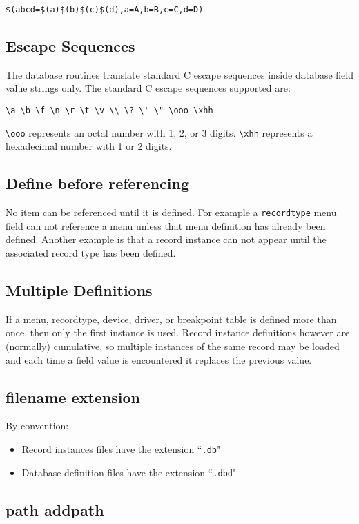 \begin{verbatim}$(abcd=$(a)$(b)$(c)$(d),a=A,b=B,c=C,d=D)
\end{verbatim}\subsection{Escape Sequences}

The database routines translate standard C escape sequences inside database field value strings only. The standard C 
escape sequences supported are:

\begin{verbatim}\a \b \f \n \r \t \v \\ \? \' \" \ooo \xhh
\end{verbatim}\verb|\ooo| represents an octal number with 1, 2, or 3 digits. \verb|\xhh| represents a hexadecimal number with 1 or 2 digits.

\subsection{Define before referencing}

No item can be referenced until it is defined. For example a \verb|recordtype| menu field can not reference a menu unless 
that menu definition has already been defined. Another example is that a record instance can not appear until the 
associated record type has been defined.

\subsection{Multiple Definitions}

If a menu, recordtype, device, driver, or breakpoint table is defined more than once, then only the first instance is used. 
Record instance definitions however are (normally) cumulative, so multiple instances of the same record may be loaded 
and each time a field value is encountered it replaces the previous value.

\subsection{filename extension}

By convention:

\begin{itemize}\item Record instances files have the extension ``\verb|.db|"

\item Database definition files have the extension ``\verb|.dbd|"

\end{itemize}\subsection{path addpath}

